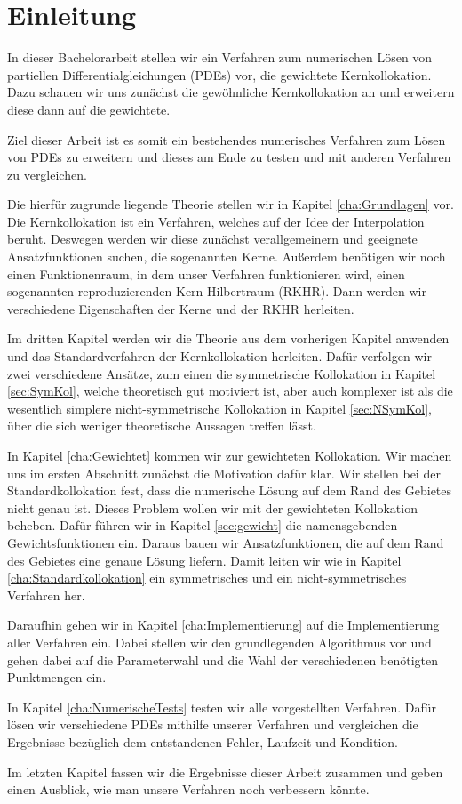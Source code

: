 \chapter{Einleitung}
\label{cha:Einleitung}
In dieser Bachelorarbeit stellen wir ein Verfahren zum numerischen Lösen von partiellen Differentialgleichungen (\acs{PDE}s) vor, die gewichtete Kernkollokation. Dazu schauen wir uns zunächst die gewöhnliche Kernkollokation an und erweitern diese dann auf die gewichtete.

Ziel dieser Arbeit ist es somit ein bestehendes numerisches Verfahren zum Lösen von \acp{PDE} zu erweitern und dieses am Ende zu testen und mit anderen Verfahren zu vergleichen.

Die hierfür zugrunde liegende Theorie stellen wir in Kapitel \ref{cha:Grundlagen} vor. Die Kernkollokation ist ein Verfahren, welches auf der Idee der Interpolation beruht. Deswegen werden wir diese zunächst verallgemeinern und geeignete Ansatzfunktionen suchen, die sogenannten Kerne. Außerdem benötigen wir noch einen Funktionenraum, in dem unser Verfahren \glqq funktionieren\grqq{} wird, einen sogenannten reproduzierenden Kern Hilbertraum (\acs{RKHR}). Dann werden wir verschiedene Eigenschaften der Kerne und der \ac{RKHR} herleiten.

Im dritten Kapitel werden wir die Theorie aus dem vorherigen Kapitel anwenden und das Standardverfahren der Kernkollokation herleiten. Dafür verfolgen wir zwei verschiedene Ansätze, zum einen die symmetrische Kollokation in Kapitel \ref{sec:SymKol}, welche theoretisch gut motiviert ist, aber auch komplexer ist als die wesentlich simplere nicht-symmetrische Kollokation in Kapitel \ref{sec:NSymKol}, über die sich weniger theoretische Aussagen treffen lässt.

In Kapitel \ref{cha:Gewichtet} kommen wir zur gewichteten Kollokation. Wir machen uns im ersten Abschnitt zunächst die Motivation dafür klar. Wir stellen bei der Standardkollokation fest, dass die numerische Lösung auf dem Rand des Gebietes nicht genau ist. Dieses Problem wollen wir mit der gewichteten Kollokation beheben. Dafür führen wir in Kapitel \ref{sec:gewicht} die namensgebenden Gewichtsfunktionen ein. Daraus bauen wir Ansatzfunktionen, die auf dem Rand des Gebietes eine genaue Lösung liefern. Damit leiten wir wie in Kapitel \ref{cha:Standardkollokation} ein symmetrisches und ein nicht-symmetrisches Verfahren her.

Daraufhin gehen wir in Kapitel \ref{cha:Implementierung} auf die Implementierung aller Verfahren ein. Dabei stellen wir den grundlegenden Algorithmus vor und gehen dabei auf die Parameterwahl und die Wahl der verschiedenen benötigten Punktmengen ein.

In Kapitel \ref{cha:NumerischeTests} testen wir alle vorgestellten Verfahren. Dafür lösen wir verschiedene \acp{PDE} mithilfe unserer Verfahren und vergleichen die Ergebnisse bezüglich dem entstandenen Fehler, Laufzeit und Kondition.

Im letzten Kapitel fassen wir die Ergebnisse dieser Arbeit zusammen und geben einen Ausblick, wie man unsere Verfahren noch verbessern könnte.

\glsresetall